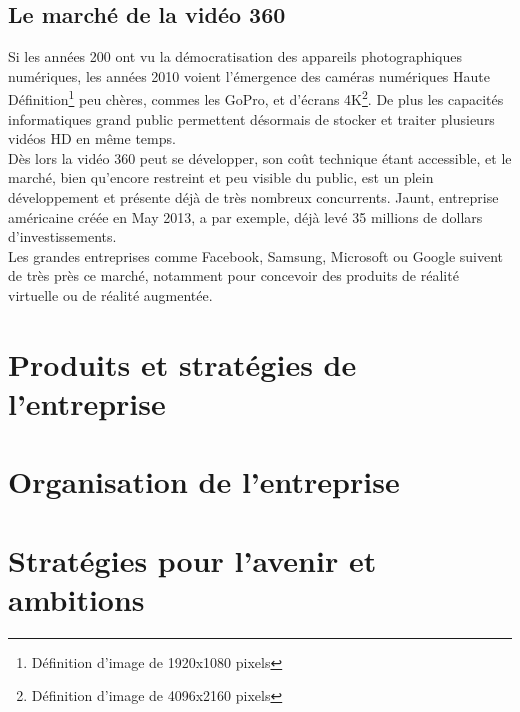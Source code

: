 \subsection{Le marché de la vidéo 360}
Si les années 200 ont vu la démocratisation des appareils photographiques numériques,
les années 2010 voient l'émergence des caméras numériques Haute 
Définition\footnote{Définition d'image de 1920x1080 pixels} peu chères, commes les GoPro,
et d'écrans 4K\footnote{Définition d'image de 4096x2160 pixels}. De plus les capacités
informatiques grand public permettent désormais de stocker et traiter plusieurs 
vidéos HD en même temps.\\
Dès lors la vidéo 360 peut se développer, son coût technique
étant accessible, et le marché, bien qu'encore restreint et peu visible du public,
est un plein développement et présente déjà de très nombreux concurrents. Jaunt,
entreprise américaine créée en May 2013, a par exemple, déjà levé 35 millions
de dollars d'investissements\cite{jaunt-fundings}.\\
Les grandes entreprises comme Facebook\cite{facebook-vr}, Samsung\cite{samsung-vr}, 
Microsoft\cite{microsoft-vr} ou Google\cite{google-vr} suivent de
très près ce marché, notamment pour concevoir des produits de réalité virtuelle 
ou de réalité augmentée.

\section{Produits et stratégies de l'entreprise}

\section{Organisation de l'entreprise}

\section{Stratégies pour l'avenir et ambitions}
